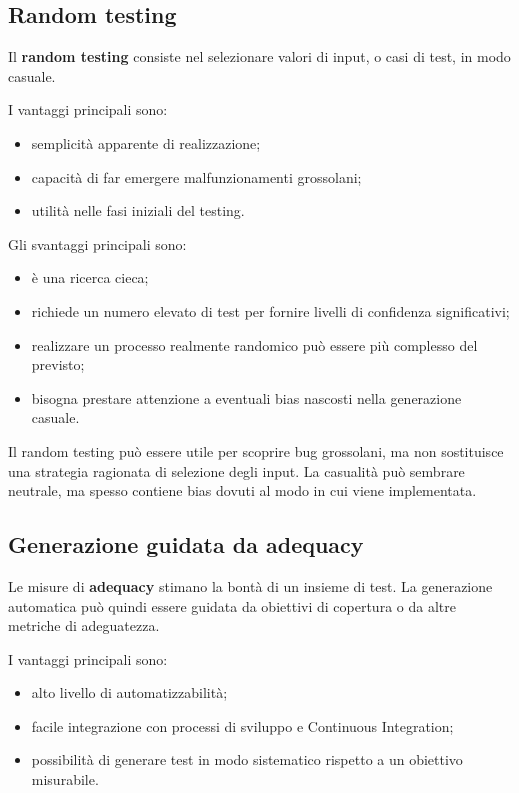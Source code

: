 \subsection{Random testing}

Il \textbf{random testing} consiste nel selezionare valori di input, o casi di test, in modo casuale.

I vantaggi principali sono:

\begin{itemize}
    \item semplicità apparente di realizzazione;
    \item capacità di far emergere malfunzionamenti grossolani;
    \item utilità nelle fasi iniziali del testing.
\end{itemize}

Gli svantaggi principali sono:

\begin{itemize}
    \item è una ricerca cieca;
    \item richiede un numero elevato di test per fornire livelli di confidenza significativi;
    \item realizzare un processo realmente randomico può essere più complesso del previsto;
    \item bisogna prestare attenzione a eventuali bias nascosti nella generazione casuale.
\end{itemize}

\begin{notaprof}
Il random testing può essere utile per scoprire bug grossolani, ma non sostituisce una strategia ragionata di selezione degli input. La casualità può sembrare neutrale, ma spesso contiene bias dovuti al modo in cui viene implementata.
\end{notaprof}

\subsection{Generazione guidata da adequacy}

Le misure di \textbf{adequacy} stimano la bontà di un insieme di test. La generazione automatica può quindi essere guidata da obiettivi di copertura o da altre metriche di adeguatezza.

I vantaggi principali sono:

\begin{itemize}
    \item alto livello di automatizzabilità;
    \item facile integrazione con processi di sviluppo e Continuous Integration;
    \item possibilità di generare test in modo sistematico rispetto a un obiettivo misurabile.
\end{itemize}

